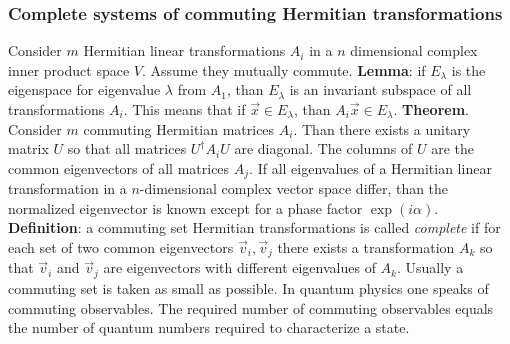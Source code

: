 \documentclass[twoside]{report}
\begin{document}
\subsubsection{Complete systems of commuting Hermitian transformations}
Consider $m$ Hermitian linear transformations $A_i$ in a $n$ dimensional
complex inner product space $V$. Assume they mutually commute.
\npar
{\bf Lemma}: if $E_\lambda$ is the eigenspace for eigenvalue $\lambda$ from
$A_1$, than $E_\lambda$ is an invariant subspace of all transformations
$A_i$. This means that if $\vec{x}\in E_\lambda$, than $A_i\vec{x}\in E_\lambda$.
\npar
{\bf Theorem}. Consider $m$ commuting Hermitian matrices $A_i$. Than there
exists a unitary matrix $U$ so that all matrices $U^\dagger A_iU$ are diagonal.
The columns of $U$ are the common eigenvectors of all matrices $A_j$.
\npar
If all eigenvalues of a Hermitian linear transformation in a $n$-dimensional
complex vector space differ, than the normalized eigenvector is known except
for a phase factor $\exp(i\alpha)$.
\npar
{\bf Definition}: a commuting set Hermitian transformations is called
{\it complete} if for each set of two common eigenvectors $\vec{v}_i,\vec{v}_j$
there exists a transformation $A_k$ so that $\vec{v}_i$ and $\vec{v}_j$ are
eigenvectors with different eigenvalues of $A_k$.
\npar
Usually a commuting set is taken as small as possible. In quantum physics one
speaks of commuting observables. The required number of commuting observables
equals the number of quantum numbers required to characterize a state.
\end{document}
